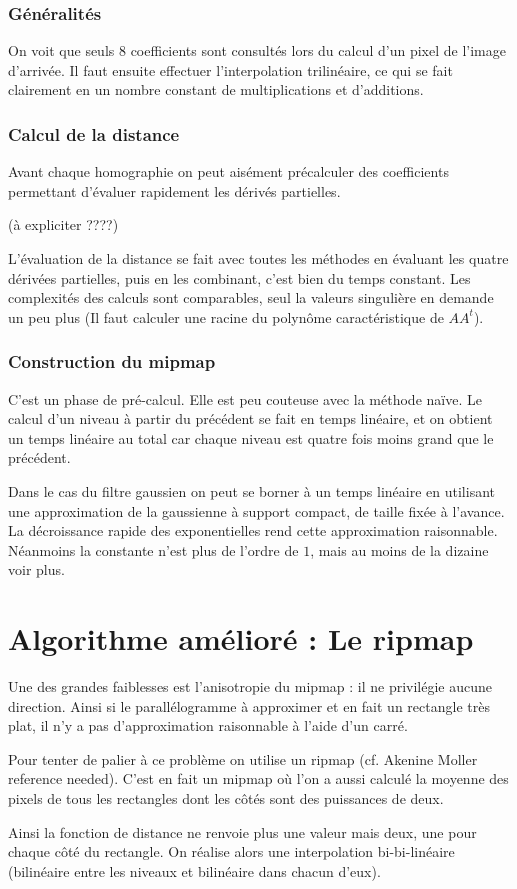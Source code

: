 \documentclass{article}
\newcommand{\se}[1]{\medbreak \medbreak \section*{#1}}
\newcommand{\ssse}[1]{\subsubsection*{#1}}
\begin{document}
\ssse{Généralités}

On voit que seuls $8$ coefficients sont consultés lors du calcul d'un pixel de l'image d'arrivée. Il faut ensuite effectuer l'interpolation trilinéaire, ce qui se fait clairement en un nombre constant de multiplications et d'additions.

\ssse{Calcul de la distance}

Avant chaque homographie on peut aisément précalculer des coefficients permettant d'évaluer rapidement les dérivés partielles. 

(à expliciter ????)

L'évaluation de la distance se fait avec toutes les méthodes en évaluant les quatre dérivées partielles, puis en les combinant, c'est bien du temps constant. Les complexités des calculs sont comparables, seul la valeurs singulière en demande un peu plus (Il faut calculer une racine du polynôme caractéristique de $AA^t$).

\ssse{Construction du mipmap}

C'est un phase de pré-calcul. Elle est peu couteuse avec la méthode naïve. Le calcul d'un niveau à partir du précédent se fait en temps linéaire, et on obtient un temps linéaire au total car chaque niveau est quatre fois moins grand que le précédent.

Dans le cas du filtre gaussien on peut se borner à un temps linéaire en utilisant une approximation de la gaussienne à support compact, de taille fixée à l'avance. La décroissance rapide des exponentielles rend cette approximation raisonnable. Néanmoins la constante n'est plus de l'ordre de $1$, mais au moins de la dizaine voir plus. 

\se{Algorithme amélioré : Le ripmap}

Une des grandes faiblesses est l'anisotropie du mipmap : il ne privilégie aucune direction. Ainsi si le parallélogramme à approximer et en fait un rectangle très plat, il n'y a pas d'approximation raisonnable à l'aide d'un carré.

Pour tenter de palier à ce problème on utilise un ripmap (cf. Akenine Moller reference needed). C'est en fait un mipmap où l'on a aussi calculé la moyenne des pixels de tous les rectangles dont les côtés sont des puissances de deux.

Ainsi la fonction de distance ne renvoie plus une valeur mais deux, une pour chaque côté du rectangle. On réalise alors une interpolation bi-bi-linéaire (bilinéaire entre les niveaux et bilinéaire dans chacun d'eux).
\end{document}
